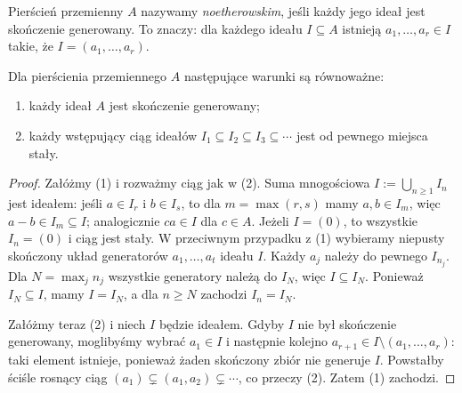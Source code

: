 \begin{definicja}
Pierścień przemienny $A$ nazywamy \emph{noetherowskim}, jeśli każdy
jego ideał jest skończenie generowany.
To znaczy: dla każdego ideału $I\subseteq A$ istnieją
$a_1,\dots,a_r\in I$ takie, że $I=(a_1,\dots,a_r)$.
\end{definicja}

\begin{lemat}
\label{lem:acc}
Dla pierścienia przemiennego $A$ następujące warunki są równoważne:
\begin{enumerate}[label=\arabic*)]
\item każdy ideał $A$ jest skończenie generowany;
\item każdy wstępujący ciąg ideałów
$I_1\subseteq I_2\subseteq I_3\subseteq\cdots$
jest od pewnego miejsca stały.
\end{enumerate}
\end{lemat}
\begin{proof}
Załóżmy (1) i rozważmy ciąg jak w (2).
Suma mnogościowa $I:=\bigcup_{n\ge1}I_n$ jest ideałem:
jeśli $a\in I_r$ i $b\in I_s$, to dla $m=\max(r,s)$
mamy $a,b\in I_m$, więc $a-b\in I_m\subseteq I$;
analogicznie $ca\in I$ dla $c\in A$.
Jeżeli $I=(0)$, to wszystkie $I_n=(0)$ i ciąg jest stały.
W przeciwnym przypadku z (1) wybieramy niepusty skończony
układ generatorów $a_1,\dots,a_t$ ideału $I$.
Każdy $a_j$ należy do pewnego
$I_{n_j}$. Dla $N=\max_j n_j$ wszystkie generatory należą
do $I_N$, więc $I\subseteq I_N$. Ponieważ $I_N\subseteq I$,
mamy $I=I_N$, a dla $n\ge N$ zachodzi $I_n=I_N$.

Załóżmy teraz (2) i niech $I$ będzie ideałem.
Gdyby $I$ nie był skończenie generowany, moglibyśmy wybrać
$a_1\in I$ i następnie kolejno $a_{r+1}\in I\setminus(a_1,\dots,a_r)$: taki element istnieje, ponieważ żaden
skończony zbiór nie generuje $I$.
Powstałby ściśle rosnący ciąg
$(a_1)\subsetneq(a_1,a_2)\subsetneq\cdots$,
co przeczy (2). Zatem (1) zachodzi.
\end{proof}

